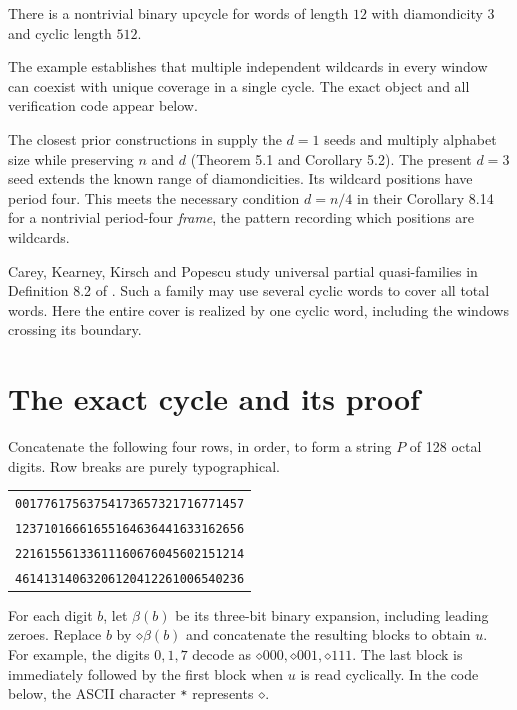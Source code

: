\documentclass[acmsmall,nonacm,11pt,natbib=false]{acmart}
\newcommand{\wild}{\mathord{\diamond}}
\begin{document}
\begin{theorem}\label{thm:main}
There is a nontrivial binary upcycle for words of length $12$ with
diamondicity $3$ and cyclic length $512$.
\end{theorem}

The example establishes that multiple
independent wildcards in every window can coexist with unique coverage in
a single cycle. The exact object and all verification code appear below.

The closest prior constructions in \cite{FGKMM26} supply the $d=1$ seeds
and multiply alphabet size while preserving $n$ and $d$ (Theorem 5.1 and
Corollary 5.2). The present $d=3$ seed extends the known range of
diamondicities. Its wildcard positions have period four. This meets the
necessary condition $d=n/4$ in their Corollary 8.14 for a nontrivial
period-four \emph{frame}, the pattern recording which positions are wildcards.

Carey, Kearney, Kirsch and Popescu study universal partial quasi-families
in Definition 8.2 of \cite{CKKP25}. Such a family may use several cyclic
words to cover all total words. Here the entire cover is realized by one
cyclic word, including the windows crossing its boundary.

\section{The exact cycle and its proof}

Concatenate the following four rows, in order, to form a string $P$ of
128 octal digits. Row breaks are purely typographical.
\begin{center}
\begin{tabular}{l}
\texttt{00177617563754173657321716771457}\\
\texttt{12371016661655164636441633162656}\\
\texttt{22161556133611160676045602151214}\\
\texttt{46141314063206120412261006540236}
\end{tabular}
\end{center}
For each digit $b$, let $\beta(b)$ be its three-bit binary expansion,
including leading zeroes. Replace $b$ by $\wild\beta(b)$ and concatenate
the resulting blocks to obtain $u$. For example, the digits $0,1,7$
decode as $\wild000,\wild001,\wild111$. The last block is immediately
followed by the first block when $u$ is read cyclically. In the code below,
the ASCII character \texttt{*} represents $\wild$.
\end{document}
